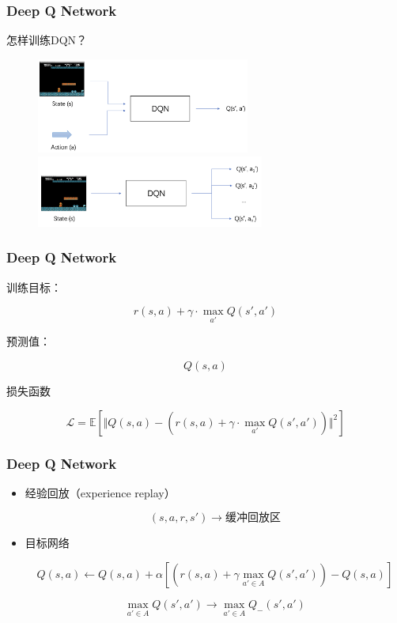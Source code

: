 \documentclass[9pt]{beamer}
\begin{document}

\begin{frame}
\frametitle{Deep Q Network}

怎样训练DQN？\pause

\vspace{1em}

\begin{figure}
\centering
\includegraphics[width=7cm]{../fig/s+a.png}
\pause
\includegraphics[width=7.5cm]{../fig/s.png}
\end{figure}

\end{frame}

\begin{frame}
\frametitle{Deep Q Network}

训练目标：

\[
r(s,a)+\gamma \cdot \max_{a'} Q(s',a')
\]

预测值：

\[
Q(s,a)
\]

损失函数

\[
\mathcal{L}=\mathbb{E}\left[ \bigg\Vert Q(s,a) - \left( r(s,a)+\gamma \cdot \max_{a'} Q(s',a')\right)\bigg\Vert^2 \right]
\]

\end{frame}

\begin{frame}
\frametitle{Deep Q Network}

\begin{itemize}
\item 经验回放（experience replay）

\[
(s,a,r,s')\rightarrow \text{缓冲回放区}
\]

\item 目标网络

\[
Q(s,a)\leftarrow Q(s,a)+\alpha \left [ \left(r(s,a) + \gamma \max_{a'\in A}Q(s',a')\right)-Q(s,a) \right]
\]

\[
\max_{a'\in A}Q(s',a')\rightarrow \max_{a'\in A}Q_-(s',a')
\]

\end{itemize}

\end{frame}
\end{document}
